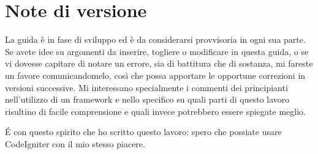
{}
\section*{Note di versione}

La guida è in fase di sviluppo ed è da considerarsi provvisoria in ogni sua parte. Se avete idee su argomenti da inserire, togliere o modificare in questa guida, o se vi dovesse capitare di notare un errore, sia di battitura che di sostanza, mi fareste un favore comunicandomelo, così che possa apportare le opportune correzioni in versioni successive. Mi interessano specialmente i commenti dei principianti nell'utilizzo di un framework e nello specifico su quali parti di questo lavoro risultino di facile comprensione e quali invece potrebbero essere spiegate meglio.

\'E con questo spirito che ho scritto questo lavoro: spero che possiate usare CodeIgniter con il mio stesso piacere.